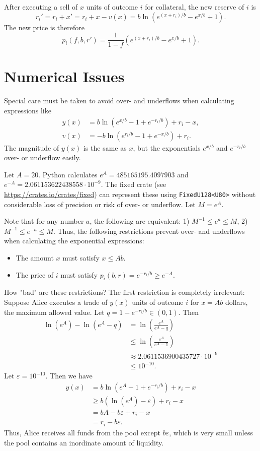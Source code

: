\documentclass[12pt]{article}
\begin{document}
After executing a sell of $x$ units of outcome $i$ for collateral, the new reserve of $i$ is
\[
    r_i' = r_i + x' = r_i + x - v(x) = b \ln (e^{(x + r_i)/b} - e^{x/b} + 1).
\]
The new price is therefore
\[
    p_i(f, b, r') = \frac{1}{1-f} (e^{(x + r_i)/b} - e^{x/b} + 1).
\]

\section{Numerical Issues}

Special care must be taken to avoid over- and underflows when calculating expressions like
\begin{align*}
    y(x) &= b \ln (e^{x/b} - 1 + e^{-r_i/b}) + r_i - x, \\
    v(x) &= -b \ln (e^{r_i/b} - 1 + e^{-x/b}) + r_i.
\end{align*}
The magnitude of $y(x)$ is the same as $x$, but the exponentials $e^{x/b}$ and $e^{-r_i/b}$ over- or underflow easily.

Let $A = 20$. Python calculates $e^A = 485165195.4097903$ and $e^{-A} = 2.061153622438558 \cdot 10^{-9}$. The fixed crate (see \url{https://crates.io/crates/fixed}) can represent these using \texttt{FixedU128<U80>} without considerable loss of precision or risk of over- or underflow. Let $M = e^A$.

Note that for any number $a$, the following are equivalent: 1) $M^{-1} \leq e^a \leq M$, 2) $M^{-1} \leq e^{-a} \leq M$. Thus, the following restrictions prevent over- and underflows when calculating the exponential expressions:

\begin{itemize}
    \item The amount $x$ must satisfy $x \leq Ab$.
    \item The price of $i$ must satisfy $p_i(b, r) = e^{-r_i/b} \geq e^{-A}$.
\end{itemize}

How "bad" are these restrictions? The first restriction is completely irrelevant: Suppose Alice executes a trade of $y(x)$ units of outcome $i$ for $x = Ab$ dollars, the maximum allowed value. Let $q = 1 - e^{-r_i/b} \in (0, 1)$. Then
\begin{align*}
    \ln(e^A) - \ln(e^A - q) &= \ln\left(\frac{e^A}{e^A - q}\right) \\
    &\leq \ln\left(\frac{e^A}{e^A - 1}\right) \\
    &\approx 2.0611536900435727 \cdot 10^{-9} \\
    &\leq 10^{-10}.
\end{align*}
Let $\varepsilon = 10^{-10}$. Then we have
\begin{align*}
    y(x) &= b\ln(e^A - 1 + e^{-r_i/b}) + r_i - x \\
    &\geq b(\ln(e^A) - \varepsilon) + r_i - x \\
    &= bA - b\varepsilon + r_i - x \\
    &= r_i - b\varepsilon.
\end{align*}
Thus, Alice receives all funds from the pool except $b \varepsilon$, which is very small unless the pool contains an inordinate amount of liquidity.
\end{document}
